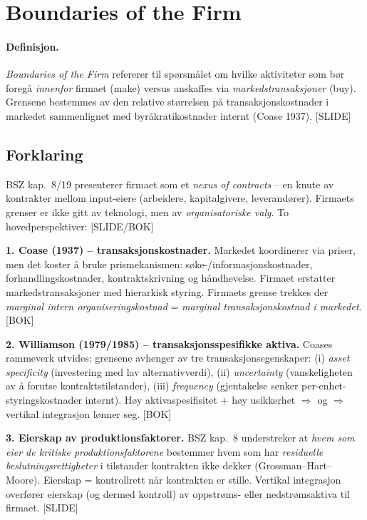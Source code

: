 \section{Boundaries of the Firm}\label{thr:boundaries-of-the-firm}

\paragraph{Definisjon.} \emph{Boundaries of the Firm} refererer til spørsmålet om hvilke aktiviteter som bør foregå \emph{innenfor} firmaet (make) versus anskaffes via \emph{markedstransaksjoner} (buy). Grensene bestemmes av den relative størrelsen på transaksjonskostnader i markedet sammenlignet med byråkratikostnader internt (Coase 1937). [SLIDE]

\subsection*{Forklaring}

BSZ kap.\ 8/19 presenterer firmaet som et \emph{nexus of contracts} -- en knute av kontrakter mellom input-eiere (arbeidere, kapitalgivere, leverandører). Firmaets grenser er ikke gitt av teknologi, men av \emph{organisatoriske valg}. To hovedperspektiver: [SLIDE/BOK]

\textbf{1. Coase (1937) -- transaksjonskostnader.} Markedet koordinerer via priser, men det koster å bruke prismekanismen: søke-/informasjonskostnader, forhandlingskostnader, kontraktskrivning og håndhevelse. Firmaet erstatter markedstransaksjoner med hierarkisk styring. Firmaets grense trekkes der \emph{marginal intern organiseringskostnad} = \emph{marginal transaksjonskostnad i markedet}. [BOK]

\textbf{2. Williamson (1979/1985) -- transaksjonsspesifikke aktiva.} Coases rammeverk utvides: grensene avhenger av tre transaksjonsegenskaper: (i) \emph{asset specificity} (investering med lav alternativverdi), (ii) \emph{uncertainty} (vanskeligheten av å forutse kontraktstilstander), (iii) \emph{frequency} (gjentakelse senker per-enhet-styringskostnader internt). Høy aktivaspesifisitet + høy usikkerhet $\Rightarrow$  og  $\Rightarrow$ vertikal integrasjon lønner seg. [BOK]

\textbf{3. Eierskap av produktionsfaktorer.} BSZ kap.\ 8 understreker at \emph{hvem som eier de kritiske produktionsfaktorene} bestemmer hvem som har \emph{residuelle beslutningsrettigheter} i tilstander kontrakten ikke dekker (Grossman--Hart--Moore). Eierskap = kontrollrett når kontrakten er stille. Vertikal integrasjon overfører eierskap (og dermed kontroll) av oppstrøms- eller nedstrømsaktiva til firmaet. [SLIDE]

